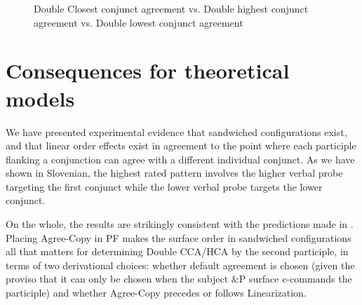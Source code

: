 \documentclass[output=paper
,modfonts
,nonflat]{langsci/langscibook}
\begin{document}
\begin{figure}
\caption{Double Closest conjunct agreement vs. Double highest conjunct agreement vs. Double lowest conjunct agreement\label{fig:figure_cca_hca_lca}}
\end{figure}

\section{Consequences for theoretical models}
We have presented experimental evidence that sandwiched configurations exist, and that linear order effects exist in agreement to the point where each participle flanking a conjunction can agree with a different individual conjunct. As we have shown in Slovenian, the highest rated pattern involves the higher verbal probe targeting the first conjunct while the lower verbal probe targets the lower conjunct. 

On the whole, the results are strikingly consistent with the predictions made in . Placing Agree-Copy in PF makes the surface order in sandwiched configurations all that matters for determining Double CCA/HCA by the second participle, in terms of two derivational choices: whether default agreement is chosen (given the proviso that it can only be chosen when the subject \&P surface c-commands the participle) and whether Agree-Copy precedes or follows Linearization.
\end{document}
